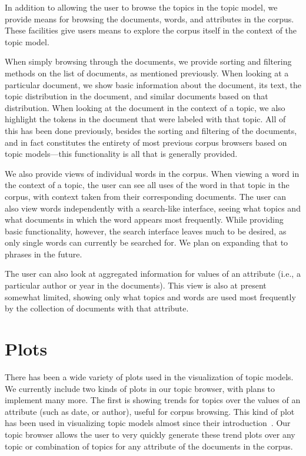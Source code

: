 \documentclass{article}
\begin{document}
In addition to allowing the user to browse the topics in the topic model, we
provide means for browsing the documents, words, and attributes in the corpus.
These facilities give users means to explore the corpus itself in the context
of the topic model.

When simply browsing through the documents, we provide sorting and filtering
methods on the list of documents, as mentioned previously.  When looking at a
particular document, we show basic information about the document, its text,
the topic distribution in the document, and similar documents based on that
distribution.  When looking at the document in the context of a topic, we also
highlight the tokens in the document that were labeled with that topic.  All of
this has been done previously, besides the sorting and filtering of the
documents, and in fact constitutes the entirety of most previous corpus
browsers based on topic models---this functionality is all that is generally
provided.

We also provide views of individual words in the corpus.  When viewing a word
in the context of a topic, the user can see all uses of the word in that topic
in the corpus, with context taken from their corresponding documents.  The user
can also view words independently with a search-like interface, seeing what
topics and what documents in which the word appears most frequently.  While
providing basic functionality, however, the search interface leaves much to be
desired, as only single words can currently be searched for.  We plan on
expanding that to phrases in the future.

The user can also look at aggregated information for values of an attribute
(i.e., a particular author or year in the documents).  This view is also at
present somewhat limited, showing only what topics and words are used most
frequently by the collection of documents with that attribute.

\section{Plots}

There has been a wide variety of plots used in the visualization of topic
models.  We currently include two kinds of plots in our topic browser, with
plans to implement many more.  The first is showing trends for topics over the
values of an attribute (such as date, or author), useful for corpus browsing.
This kind of plot has been used in visualizing topic models almost since their
introduction~\cite{griffiths-2004-finding-scientific-topics}.  Our topic
browser allows the user to very quickly generate these trend plots over any
topic or combination of topics for any attribute of the documents in the
corpus.
\end{document}
